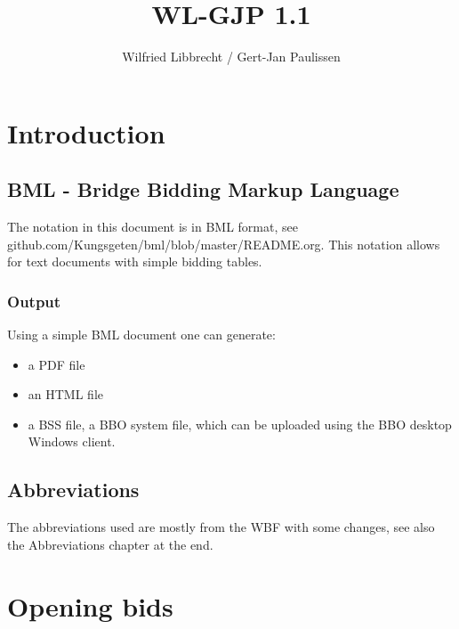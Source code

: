 \documentclass[a4paper]{article}
\title{WL-GJP 1.1}
\author{Wilfried Libbrecht / Gert-Jan Paulissen}
\begin{document}
\maketitle
\tableofcontents

\section{Introduction}

\subsection{BML - Bridge Bidding Markup Language}

The notation in this document is in BML format, see
github.com/Kungsgeten/bml/blob/master/README.org.
\bigbreak
This notation allows for text documents with simple bidding tables.
\bigbreak
\subsubsection{Output}

Using a simple BML document one can generate:
\bigbreak
\begin{itemize}
\item a PDF file

\item an HTML file

\item a BSS file, a BBO system file, which can be uploaded using the BBO desktop Windows client.

\end{itemize}
\bigbreak
\subsection{Abbreviations}

The abbreviations used are mostly from the WBF with some changes, see also the
Abbreviations chapter at the end.
\bigbreak
\section{Opening bids}
\end{document}

